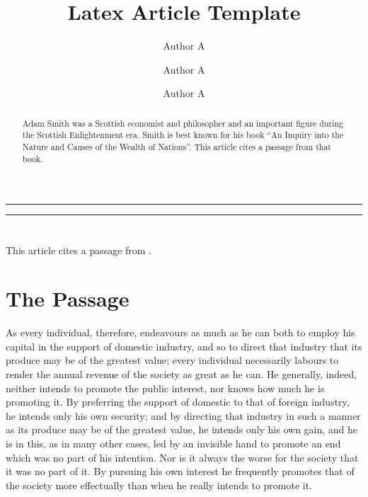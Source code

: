 \documentclass[10 pt,a4paper]{article}
\title{\LARGE Latex Article Template}
\date{}
\author[1]{Author A}
\author[2]{Author A}
\author[3]{Author A}
\affil[1]{\it\small Department of Economics, University 1, ...}
\affil[2]{\it\small Department of Statistics, University 2, ...}
\affil[3]{\it\small Department of Mathematics, University 3, ...}
\begin{document}
\maketitle
\thispagestyle{empty}

\par\noindent\rule{\textwidth}{0.4pt} %
\begin{abstract}
Adam Smith was a Scottish economist and philosopher and an important figure during the Scottish Enlightenment era. Smith is best known for his book ``An Inquiry into the Nature and Causes of the Wealth of Nations''. This article cites a passage from that book.
\end{abstract}
\par\noindent\rule{\textwidth}{0.4pt} %
\vspace*{-1.7cm} %

\section*{} %

This article cites a passage from \citet{smith1827inquiry}.

\section{The Passage}

As every individual, therefore, endeavours as much as he can both to employ his capital in the support of domestic industry, and so to direct that industry that its produce may be of the greatest value; every individual necessarily labours to render the annual revenue of the society as great as he can. He generally, indeed, neither intends to promote the public interest, nor knows how much he is promoting it. By preferring the support of domestic to that of foreign industry, he intends only his own security; and by directing that industry in such a manner as its produce may be of the greatest value, he intends only his own gain, and he is in this, as in many other cases, led by an invisible hand to promote an end which was no part of his intention. Nor is it always the worse for the society that it was no part of it. By pursuing his own interest he frequently promotes that of the society more effectually than when he really intends to promote it.



\end{document}
